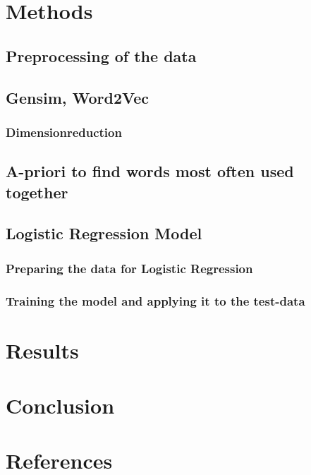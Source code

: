 \documentclass[11pt,a4paper]{article}
\begin{document}
\section{Methods}
\subsection{Preprocessing of the data}
\subsection{Gensim, Word2Vec}
\subsubsection{Dimensionreduction}
\subsection{A-priori to find words most often used together}
\subsection{Logistic Regression Model}
\subsubsection{Preparing the data for Logistic Regression}
\subsubsection{Training the model and applying it to the test-data}
\section{Results}
\section{Conclusion}
\section{References}
\end{document}
